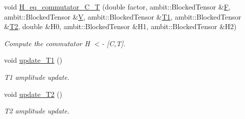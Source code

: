 \begin{DoxyCompactItemize}
void \mbox{\hyperlink{classforte_1_1_s_o_m_r_d_s_r_g_a6d10dbf7735e9659a238f4d7d8900330}{H\+\_\+eq\+\_\+commutator\+\_\+\+C\+\_\+T}} (double factor, ambit\+::\+Blocked\+Tensor \&\mbox{\hyperlink{classforte_1_1_s_o_m_r_d_s_r_g_a051b4339422de305d80471445d6fcf43}{F}}, ambit\+::\+Blocked\+Tensor \&\mbox{\hyperlink{classforte_1_1_s_o_m_r_d_s_r_g_a7622bcf46fdad30ab325008e244af10c}{V}}, ambit\+::\+Blocked\+Tensor \&\mbox{\hyperlink{classforte_1_1_s_o_m_r_d_s_r_g_a024bdc535cac58aed0013b9dd8de0a2a}{T1}}, ambit\+::\+Blocked\+Tensor \&\mbox{\hyperlink{classforte_1_1_s_o_m_r_d_s_r_g_ae7899934624bd03d7acd408d11f8009e}{T2}}, double \&H0, ambit\+::\+Blocked\+Tensor \&H1, ambit\+::\+Blocked\+Tensor \&H2)
\begin{DoxyCompactList}\small\item\em Compute the commutator H $<$-\/ \mbox{[}C,T\mbox{]}. \end{DoxyCompactList}\item 
void \mbox{\hyperlink{classforte_1_1_s_o_m_r_d_s_r_g_ad56007462336eb1b2fcc5145101d7de8}{update\+\_\+\+T1}} ()
\begin{DoxyCompactList}\small\item\em T1 amplitude update. \end{DoxyCompactList}\item 
void \mbox{\hyperlink{classforte_1_1_s_o_m_r_d_s_r_g_a394dd57e9210edabd70bb291ecba8eb4}{update\+\_\+\+T2}} ()
\begin{DoxyCompactList}\small\item\em T2 amplitude update. \end{DoxyCompactList}\end{DoxyCompactItemize}
